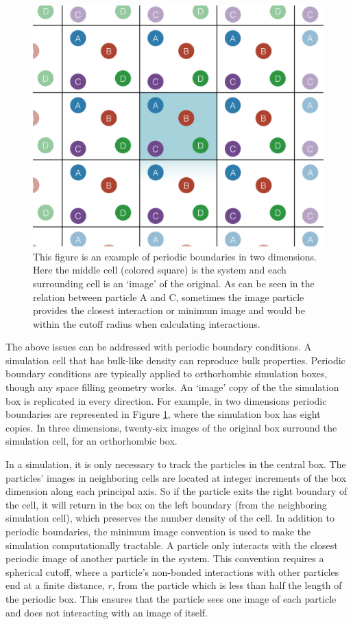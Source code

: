 \begin{figure}
    \includegraphics[scale=0.5]{figures/pbc-center.pdf}
    \caption{This figure is an example of periodic boundaries in two dimensions. Here the middle cell (colored square) is the system and each surrounding cell is an `image' of the original. As can be seen in the relation between particle A and C, sometimes the image particle provides the closest interaction or minimum image and would be within the cutoff radius when calculating interactions.}
    \label{fig:pbc}
\end{figure}

The above issues can be addressed with periodic boundary conditions. A simulation cell that has bulk-like density can reproduce bulk properties. Periodic boundary conditions are typically applied to orthorhombic simulation boxes, though any space filling geometry works. An `image' copy of the the simulation box is replicated in every direction. For example, in two dimensions periodic boundaries are represented in Figure \ref{fig:pbc}, where the simulation box has eight copies. In three dimensions, twenty-six images of the original box surround the simulation cell, for an orthorhombic box.
    
In a simulation, it is only necessary to track the particles in the central box.
The particles' images in neighboring cells are located at integer increments of the box dimension along each principal axis. 
So if the particle exits the right boundary of the cell, it will return in the box on the left boundary (from the neighboring simulation cell), which preserves the number density of the cell. 
In addition to periodic boundaries, the minimum image convention is used to make the simulation computationally tractable. A particle only interacts with the closest periodic image of another particle in the system. 
This convention requires a spherical cutoff, where a particle's non-bonded interactions with other particles end at a finite distance, $r$, from the particle which is less than half the length of the periodic box. This ensures that the particle sees one image of each particle and does not interacting with an image of itself. 

